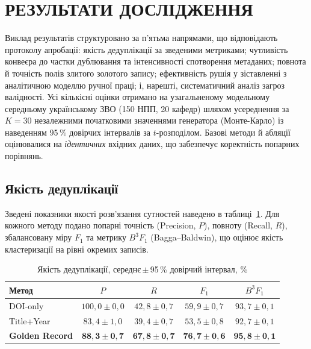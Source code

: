 \section*{РЕЗУЛЬТАТИ ДОСЛІДЖЕННЯ}

Виклад результатів структуровано за п'ятьма напрямами, що відповідають протоколу апробації: якість дедуплікації за зведеними метриками; чутливість конвеєра до частки дублювання та інтенсивності спотворення метаданих; повнота й точність полів злитого золотого запису; ефективність рушія у зіставленні з аналітичною моделлю ручної праці; і, нарешті, систематичний аналіз загроз валідності. Усі кількісні оцінки отримано на узагальненому модельному середньому українському ЗВО (150 НПП, 20 кафедр) шляхом усереднення за $K=30$ незалежними початковими значеннями генератора (Монте-Карло) із наведенням 95\,\% довірчих інтервалів за $t$-розподілом. Базові методи й абляції оцінювалися на \textit{ідентичних} вхідних даних, що забезпечує коректність попарних порівнянь.

\subsection*{Якість дедуплікації}

Зведені показники якості розв'язання сутностей наведено в таблиці~\ref{tab:res-dedup}. Для кожного методу подано попарні точність (Precision, $P$), повноту (Recall, $R$), збалансовану міру $F_1$ та метрику $B^3 F_1$ (Bagga--Baldwin), що оцінює якість кластеризації на рівні окремих записів.

\begin{table}[ht]
\centering
\caption{Якість дедуплікації, середнє\,$\pm$\,95\,\% довірчий інтервал, \%}
\label{tab:res-dedup}
\begin{tabular}{lcccc}
\toprule
Метод & $P$ & $R$ & $F_1$ & $B^3 F_1$ \\
\midrule
DOI-only        & $100{,}0 \pm 0{,}0$ & $42{,}8 \pm 0{,}7$ & $59{,}9 \pm 0{,}7$ & $93{,}7 \pm 0{,}1$ \\
Title+Year      & $83{,}4 \pm 1{,}0$  & $39{,}4 \pm 0{,}7$ & $53{,}5 \pm 0{,}8$ & $92{,}7 \pm 0{,}1$ \\
\textbf{Golden Record} & $\mathbf{88{,}3 \pm 0{,}7}$ & $\mathbf{67{,}8 \pm 0{,}7}$ & $\mathbf{76{,}7 \pm 0{,}6}$ & $\mathbf{95{,}8 \pm 0{,}1}$ \\
\bottomrule
\end{tabular}
\end{table}

